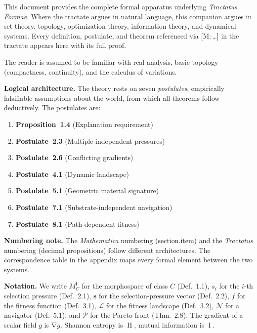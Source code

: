 \documentclass[10pt]{article}
\theoremstyle{definition}
\theoremstyle{plain}
\theoremstyle{remark}
\newcommand{\MC}{M^{\mathsf{I}}_C}          %
\newcommand{\Pareto}{\mathcal{P}}            %
\newcommand{\FitLand}{\mathcal{L}}           %
\newcommand{\Nav}{\mathcal{N}}               %
\DeclareMathOperator{\grad}{\nabla}
\DeclareMathOperator{\MI}{I}                 %
\DeclareMathOperator{\Ent}{H}                %
\begin{document}
This document provides the complete formal apparatus underlying
\textit{Tractatus Formae}. Where the tractate argues in natural language,
this companion argues in set theory, topology, optimization theory,
information theory, and dynamical systems. Every definition, postulate,
and theorem referenced via \textup{[M:\,\ldots]} in the tractate appears
here with its full proof.

The reader is assumed to be familiar with real analysis,
basic topology (compactness, continuity), and the calculus of
variations.

\medskip\noindent\textbf{Logical architecture.}
The theory rests on seven \emph{postulates}, empirically falsifiable
assumptions about the world, from which all theorems follow deductively.
The postulates are:
\begin{enumerate}[nosep]
  \item \textbf{Proposition~1.4}\; (Explanation requirement)
  \item \textbf{Postulate~2.3}\; (Multiple independent pressures)
  \item \textbf{Postulate~2.6}\; (Conflicting gradients)
  \item \textbf{Postulate~4.1}\; (Dynamic landscape)
  \item \textbf{Postulate~5.1}\; (Geometric material signature)
  \item \textbf{Postulate~7.1}\; (Substrate-independent navigation)
  \item \textbf{Postulate~8.1}\; (Path-dependent fitness)
\end{enumerate}

\medskip\noindent\textbf{Numbering note.}
The \textit{Mathematica} numbering (section.item) and the
\textit{Tractatus} numbering (decimal propositions) follow
different architectures. The correspondence table in the appendix
maps every formal element between the two systems.

\medskip\noindent\textbf{Notation.}
We write $\MC$ for the morphospace of class $C$ (Def.~1.1),
$s_i$ for the $i$-th selection pressure (Def.~2.1),
$\bm{s}$ for the selection-pressure vector (Def.~2.2),
$f$ for the fitness function (Def.~3.1),
$\FitLand$ for the fitness landscape (Def.~3.2),
$\Nav$ for a navigator (Def.~5.1),
and $\Pareto$ for the Pareto front (Thm.~2.8).
The gradient of a scalar field $g$ is $\grad g$.
Shannon entropy is $\Ent$, mutual information is $\MI$.

\newpage
\end{document}

